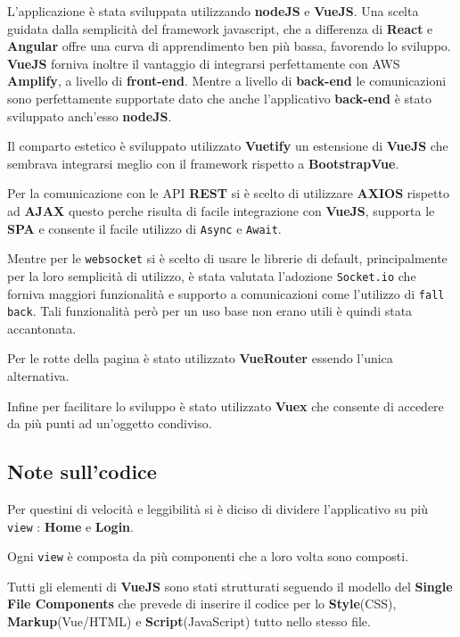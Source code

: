         L'applicazione è stata sviluppata utilizzando \textbf{nodeJS} e \textbf{VueJS}. 
        Una scelta guidata dalla semplicità del framework javascript, che a differenza di \textbf{React} e \textbf{Angular} offre una curva di apprendimento ben più bassa, favorendo lo sviluppo. 
        \textbf{VueJS} forniva inoltre il vantaggio di integrarsi perfettamente con AWS \textbf{Amplify}, a livello di \textbf{front-end}.
        Mentre a livello di \textbf{back-end} le comunicazioni sono perfettamente supportate dato che anche l'applicativo \textbf{back-end} è stato sviluppato anch'esso \textbf{nodeJS}.
        
        Il comparto estetico è sviluppato utilizzato \textbf{Vuetify} un estensione di \textbf{VueJS} che sembrava integrarsi meglio con il framework rispetto a \textbf{BootstrapVue}.
        
        Per la comunicazione con le API \textbf{REST} si è scelto di utilizzare \textbf{AXIOS} rispetto ad \textbf{AJAX} questo perche risulta di facile integrazione con \textbf{VueJS}, supporta le \textbf{SPA} e consente il facile utilizzo di \texttt{Async} e \texttt{Await}.
        
        Mentre per le \texttt{websocket} si è scelto di usare le librerie di default, principalmente per la loro semplicità di utilizzo, è stata valutata l'adozione  \texttt{Socket.io} che forniva maggiori funzionalità  e supporto a comunicazioni   come l'utilizzo di \texttt{fall back}.
        Tali funzionalità però per un uso base non erano utili è quindi stata accantonata.
        
        Per le rotte della pagina è stato utilizzato \textbf{VueRouter}
        essendo l'unica alternativa.
        
        Infine per facilitare lo sviluppo è stato utilizzato \textbf{Vuex} che consente di accedere da più punti ad un'oggetto condiviso.
        
    \subsection{Note sull'codice}
        Per questini di velocità e leggibilità si è diciso di dividere l'applicativo su più \texttt{view} : \textbf{Home} e \textbf{Login}.
        
        Ogni \texttt{view} è composta da più componenti che a loro volta sono composti.
        
        Tutti gli elementi di \textbf{VueJS} sono stati strutturati seguendo il modello del \textbf{Single File Components} che prevede di inserire il codice per lo \textbf{Style}(CSS), \textbf{Markup}(Vue/HTML) e \textbf{Script}(JavaScript) tutto nello stesso file.
        
